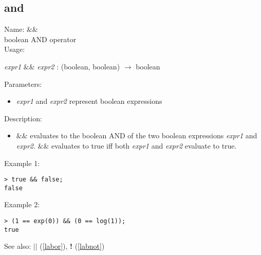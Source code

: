 \subsection{and}
\label{laband}
\noindent Name: \textbf{$\&\&$}\\
boolean AND operator\\

\noindent Usage: 
\begin{center}
\emph{expr1} \textbf{$\&\&$} \emph{expr2} : (\textsf{boolean}, \textsf{boolean}) $\rightarrow$ \textsf{boolean}\\
\end{center}
Parameters: 
\begin{itemize}
\item \emph{expr1} and \emph{expr2} represent boolean expressions
\end{itemize}
\noindent Description: \begin{itemize}

\item \textbf{$\&\&$} evaluates to the boolean AND of the two
   boolean expressions \emph{expr1} and \emph{expr2}. \textbf{$\&\&$} evaluates to 
   true iff both \emph{expr1} and \emph{expr2} evaluate to true.
\end{itemize}
\noindent Example 1: 
\begin{center}\begin{minipage}{15cm}\begin{Verbatim}[frame=single]
> true && false;
false
\end{Verbatim}
\end{minipage}\end{center}
\noindent Example 2: 
\begin{center}\begin{minipage}{15cm}\begin{Verbatim}[frame=single]
> (1 == exp(0)) && (0 == log(1));
true
\end{Verbatim}
\end{minipage}\end{center}
See also: \textbf{$||$} (\ref{labor}), \textbf{!} (\ref{labnot})
